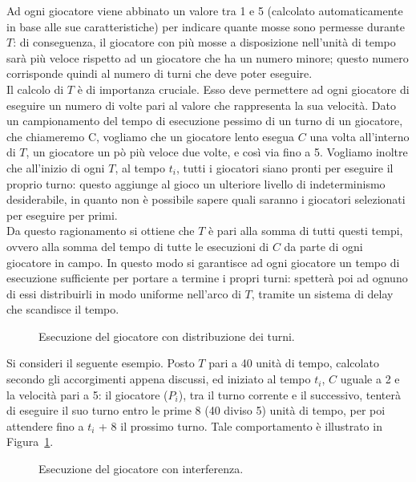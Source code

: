 Ad ogni giocatore viene abbinato un valore tra 1 e 5 (calcolato automaticamente in base alle sue caratteristiche) per indicare quante mosse sono permesse durante $T$: di conseguenza, il giocatore con più mosse a disposizione nell'unità di tempo sarà più veloce rispetto ad un giocatore che ha un numero minore; questo numero corrisponde quindi al numero di turni che deve poter eseguire.\\

Il calcolo di $T$ è di importanza cruciale. Esso deve permettere ad ogni giocatore di eseguire un numero di volte pari al valore che rappresenta la sua velocità. Dato un campionamento del tempo di esecuzione pessimo di un turno di un giocatore, che chiameremo C, vogliamo che un giocatore lento esegua $C$ una volta all'interno di $T$, un giocatore un pò più veloce due volte, e così via fino a 5. Vogliamo inoltre che all'inizio di ogni $T$, al tempo $t_i$, tutti i giocatori siano pronti per eseguire il proprio turno: questo aggiunge al gioco un ulteriore livello di indeterminismo desiderabile, in quanto non è possibile sapere quali saranno i giocatori selezionati per eseguire per primi.\\

Da questo ragionamento si ottiene che $T$ è pari alla somma di tutti questi tempi, ovvero alla somma del tempo di tutte le esecuzioni di $C$ da parte di ogni giocatore in campo. In questo modo si garantisce ad ogni giocatore un tempo di esecuzione sufficiente per portare a termine i propri turni: spetterà poi ad ognuno di essi distribuirli in modo uniforme nell'arco di $T$, tramite un sistema di delay che scandisce il tempo.\\

\begin{figure}[htb!]
	\centering
	\exampleOne
	\caption{Esecuzione del giocatore con distribuzione dei turni.}
	\label{fig:hyperperiod_normal}
\end{figure}

Si consideri il seguente esempio. Posto $T$ pari a 40 unità di tempo, calcolato secondo gli accorgimenti appena discussi, ed iniziato al tempo $t_i$, $C$ uguale a 2 e la velocità pari a 5: il giocatore ($P_i$), tra il turno corrente e il successivo, tenterà di eseguire il suo turno entro le prime 8 (40 diviso 5) unità di tempo, per poi attendere fino a $t_i$ + 8 il prossimo turno. Tale comportamento è illustrato in Figura~\ref{fig:hyperperiod_normal}.\\

\begin{figure}[htb!]
	\centering
	\exampleTwo
	\caption{Esecuzione del giocatore con interferenza.}
	\label{fig:hyperperiod_interference}
\end{figure}

